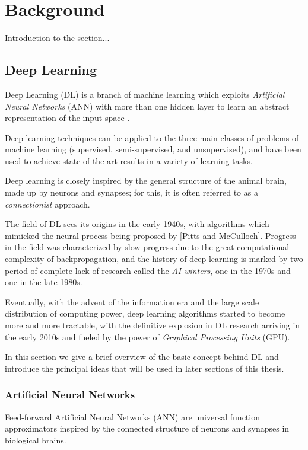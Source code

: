 \chapter{Background}
\label{ch1_intro}
\thispagestyle{empty}

\vspace{0.5cm}

\noindent Introduction to the section...

\section{Deep Learning} \label{s:DL}
Deep Learning (DL) is a branch of machine learning which exploits 
\textit{Artificial Neural Networks} (ANN) with more than one hidden layer to 
learn an abstract representation of the input space \cite{lecun2015deep}. 

Deep learning techniques can be applied to the three main classes of problems 
of machine learning (supervised, semi-supervised, and unsupervised), and have 
been used to achieve state-of-the-art results in a variety of learning tasks.

Deep learning is closely inspired by the general structure of the animal brain, 
made up by neurons and synapses; for this, it is often referred to as a 
\textit{connectionist} approach. 

The field of DL sees its origins in the early 1940s, with algorithms which 
mimicked the neural process being proposed by [Pitts and McCulloch]. 
Progress in the field was characterized by slow progress due to the great
computational complexity of backpropagation, and the history of deep learning 
is marked by two period of complete lack of research called the \textit{AI
winters}, one in the 1970s and one in the late 1980s. 

Eventually, with the advent of the information era and the large scale 
distribution of computing power, deep learning algorithms started to become 
more and more tractable, with the definitive explosion in DL research arriving
in the early 2010s and fueled by the power of \textit{Graphical Processing 
Units} (GPU).

In this section we give a brief overview of the basic concept behind DL and
introduce the principal ideas that will be used in later sections of this 
thesis.

\subsection{Artificial Neural Networks}
Feed-forward Artificial Neural Networks (ANN) are universal function 
approximators inspired by the connected structure of neurons and synapses in 
biological brains.

